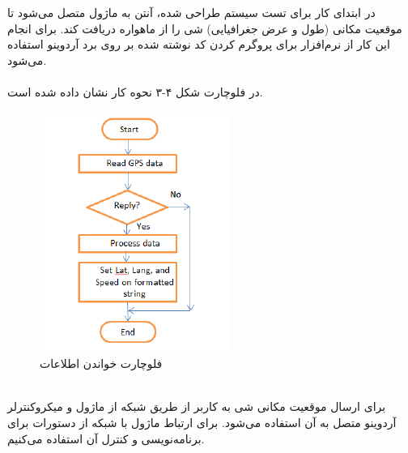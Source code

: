 در ابتدای کار برای تست سیستم طراحی شده، آنتن  به ماژول  متصل می‌شود تا موقعیت مکانی (طول و عرض جغرافیایی) شی را از ماهواره دریافت کند. برای انجام این کار از نرم‌افزار  برای پروگرم کردن کد نوشته شده بر روی برد آردوینو استفاده می‌شود.\\
\\
در فلوچارت شکل ۴-۳ نحوه کار  نشان داده شده است.
\begin{figure}[!h]
	\centerline{\includegraphics[width=.6\textwidth]{gps-flowchart}}
	\caption{فلوچارت خواندن اطلاعات  \cite{ElShafee2013}}
\end{figure}
\\

برای ارسال موقعیت مکانی شی به کاربر از طریق شبکه  از ماژول  و میکروکنترلر آردوینو متصل به آن استفاده می‌شود. برای ارتباط ماژول  با شبکه  از دستورات  برای برنامه‌نویسی و کنترل آن استفاده می‌کنیم.\\

